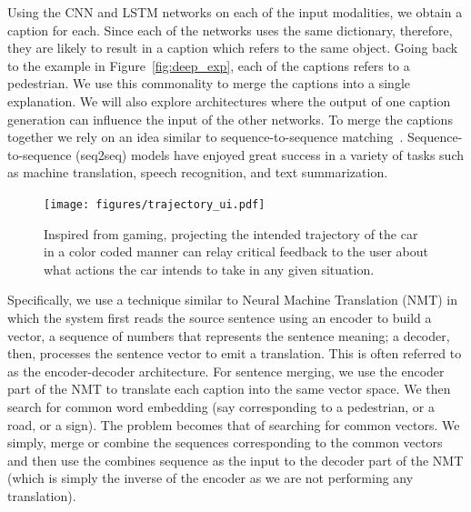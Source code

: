 Using the CNN and LSTM networks on each of the input modalities, we obtain a caption for each.
Since each of the networks uses the same dictionary, therefore, they are likely to result in a caption which refers to the same object. 
Going back to the example in Figure~\ref{fig:deep_exp}, each of the captions refers to a pedestrian. 
We use this commonality to merge the captions into a single explanation. 
We will also explore architectures where the output of one caption generation can influence the input of the other networks. 
To merge the captions together we rely on an idea similar to sequence-to-sequence matching~\cite{sutskever2014sequence}.
Sequence-to-sequence (seq2seq) models have enjoyed great success in a variety of tasks such as machine translation, speech recognition, and text summarization.
\begin{figure}
  \begin{center}
    \texttt{[image: figures/trajectory\_ui.pdf]}
  \end{center}
  \caption{Inspired from gaming, projecting the intended trajectory of the car in a color coded manner can relay critical feedback to the user about what actions the car intends to take in any given situation.}
  \label{fig:trajectory}
\end{figure}
Specifically, we use a technique similar to Neural Machine Translation (NMT) in which the system first reads the source sentence using an encoder to build a vector, a sequence of numbers that represents the sentence meaning; a decoder, then, processes the sentence vector to emit a translation.
This is often referred to as the encoder-decoder architecture. 
For sentence merging, we use the encoder part of the NMT to translate each caption into the same vector space. 
We then search for common word embedding (say corresponding to a pedestrian, or a road, or a sign). The problem becomes that of searching for common vectors. We simply, merge or combine the sequences corresponding to the common vectors and then use the combines sequence as the input to the decoder part of the NMT (which is simply the inverse of the encoder as we are not performing any translation). 
